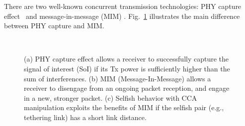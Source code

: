 There are two well-known concurrent transmission technologies:
PHY capture effect~\cite{capture} and message-in-message (MIM)
\cite{jlee:ychoi07, MIM}.
Fig.~\ref{fig:capture} illustrates the main difference between PHY
capture and MIM.
%
%
\begin{figure} [t]
\center
  \\
  \caption{(a) PHY capture effect allows a receiver to successfully capture
    the signal of interest (SoI) if its Tx power is sufficiently higher
    than the sum of interferences. (b) MIM (Message-In-Message) allows
    a receiver to disengage from an ongoing packet reception, and
    engage in a new, stronger packet. (c) Selfish behavior with CCA manipulation exploits
    the benefits of MIM if the selfish pair (e.g., tethering link) has a short link distance.}
    \label{fig:capture}
\end{figure}
